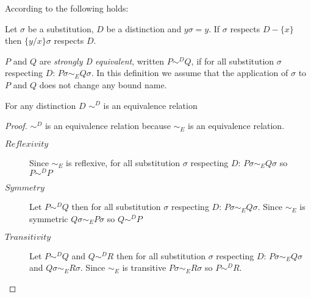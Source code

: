 According to \cite{milnerparrowwalker} the following holds:
\begin{lemma}\label{distinctionSubstitution2}
  Let $\sigma$ be a substitution, $D$ be a distinction and $y \sigma = y$. If $\sigma$ respects $D-\{x\}$ then $\{y/x\}\sigma$ respects $D$.
\end{lemma}



\begin{definition}\label{strongDequivalence}
  $P$ and $Q$ are \emph{strongly D equivalent}, written $P \sim^{D} Q$, if for all substitution $\sigma$ respecting $D$: $P\sigma \sim_{E} Q\sigma$. In this definition we assume that the application of $\sigma$ to $P$ and $Q$ does not change any bound name.
\end{definition}

 
\begin{lemma}\label{strongDEquivalenceIsAnEquivalence}
  For any distinction $D$ $\sim^{D}$ is an equivalence relation
  \begin{proof}
    $\sim^{D}$ is an equivalence relation because $\sim_{E}$ is an equivalence relation.
    \begin{description}
      \item[$Reflexivity$]
	Since $\sim_{E}$ is reflexive, for all substitution $\sigma$ respecting $D$: $P\sigma \sim_{E} Q\sigma$ so $P \sim^{D} P$
      \item[$Symmetry$]
	Let $P \sim^{D} Q$ then for all substitution $\sigma$ respecting $D$: $P\sigma \sim_{E} Q\sigma$. Since $\sim_{E}$ is symmetric $Q\sigma \sim_{E} P\sigma$ so $Q \sim^{D} P$
      \item[$Transitivity$]
	Let $P \sim^{D} Q$ and $Q \sim^{D} R$ then for all substitution $\sigma$ respecting $D$: $P\sigma \sim_{E} Q\sigma$ and $Q\sigma \sim_{E} R\sigma$. Since $\sim_{E}$ is transitive $P\sigma \sim_{E} R\sigma$ so $P \sim^{D} R$.
    \end{description}
  \end{proof}
\end{lemma}

% 


